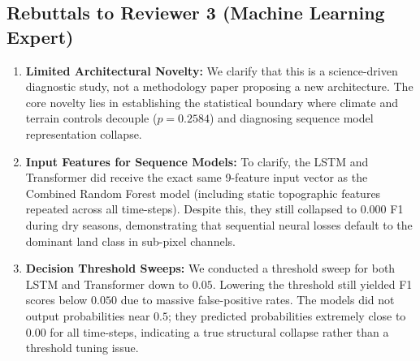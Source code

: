 \subsection*{Rebuttals to Reviewer 3 (Machine Learning Expert)}

\begin{enumerate}
    \item \textbf{Limited Architectural Novelty:} We clarify that this is a science-driven diagnostic study, not a methodology paper proposing a new architecture. The core novelty lies in establishing the statistical boundary where climate and terrain controls decouple ($p = 0.2584$) and diagnosing sequence model representation collapse.
    \item \textbf{Input Features for Sequence Models:} To clarify, the LSTM and Transformer did receive the exact same 9-feature input vector as the Combined Random Forest model (including static topographic features repeated across all time-steps). Despite this, they still collapsed to $0.000$ F1 during dry seasons, demonstrating that sequential neural losses default to the dominant land class in sub-pixel channels.
    \item \textbf{Decision Threshold Sweeps:} We conducted a threshold sweep for both LSTM and Transformer down to $0.05$. Lowering the threshold still yielded F1 scores below $0.050$ due to massive false-positive rates. The models did not output probabilities near $0.5$; they predicted probabilities extremely close to $0.00$ for all time-steps, indicating a true structural collapse rather than a threshold tuning issue.
\end{enumerate}
